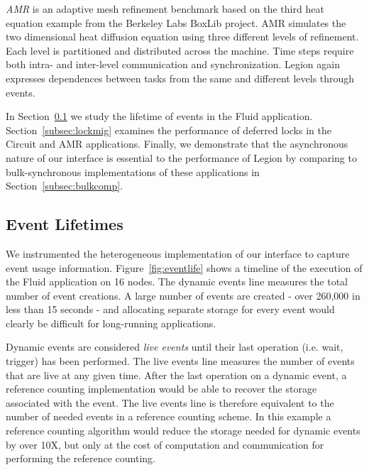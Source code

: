 {\em AMR} is an adaptive mesh refinement benchmark based on the third heat
equation example from the Berkeley Labs BoxLib project\cite{BoxLib}.  AMR
simulates the two dimensional heat diffusion equation using three different levels
of refinement.  Each level is partitioned and distributed across the machine.  Time steps require
both intra- and inter-level communication and synchronization.  Legion again
expresses dependences between tasks from the same and different levels through
events.

In Section~\ref{subsec:eventlife} we study the lifetime of events in
the Fluid application.  Section~\ref{subsec:lockmig} examines
the performance of deferred locks in the Circuit and AMR applications.  
Finally, we demonstrate
that the asynchronous nature of our interface is essential to the
performance of Legion by comparing to bulk-synchronous
implementations of these applications in Section~\ref{subsec:bulkcomp}.
  
\subsection{Event Lifetimes}
\label{subsec:eventlife}

We instrumented the heterogeneous implementation of our interface to 
capture event usage information.  Figure~\ref{fig:eventlife} shows
a timeline of the execution of the Fluid application on 16 nodes.
The dynamic events line measures the total number of event creations.
A large number of events are created - over 260,000 in less than 15
seconds - and allocating separate storage for every event would clearly
be difficult for long-running applications.  

Dynamic events are considered {\em live events} until their last operation 
(i.e. wait, trigger) has been performed.  The live events line
measures the number of events that are live at any given time.  After
the last operation on a dynamic event, a reference counting implementation would
be able to recover the storage associated with the event.  The live events line
is therefore equivalent to the number of needed events in a reference counting
scheme.  In this example 
a reference counting algorithm would reduce the storage needed for dynamic events
by over 10X, but only at the cost of
computation and communication for performing the reference counting.  

